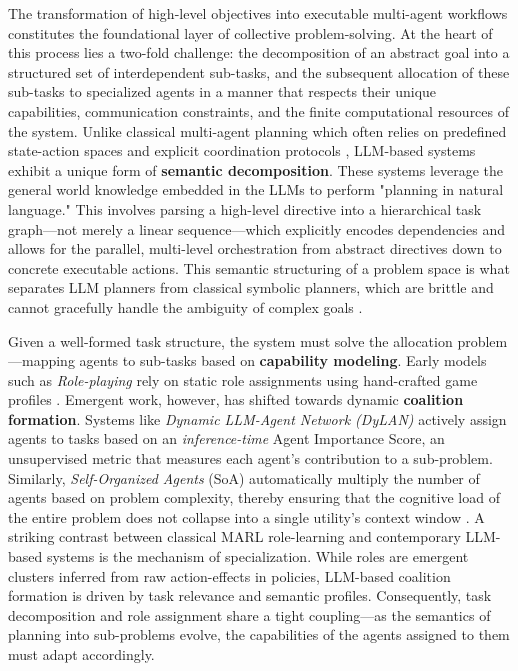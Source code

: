 \documentclass[11pt,a4paper]{article}
\begin{document}
The transformation of high-level objectives into executable multi-agent workflows constitutes the foundational layer of collective problem-solving. At the heart of this process lies a two-fold challenge: the decomposition of an abstract goal into a structured set of interdependent sub-tasks, and the subsequent allocation of these sub-tasks to specialized agents in a manner that respects their unique capabilities, communication constraints, and the finite computational resources of the system. Unlike classical multi-agent planning which often relies on predefined state-action spaces and explicit coordination protocols \cite{arxiv:1501.07423v1,arxiv:1803.05464v1}, LLM-based systems exhibit a unique form of \textbf{semantic decomposition}. These systems leverage the general world knowledge embedded in the LLMs to perform "planning in natural language." This involves parsing a high-level directive into a hierarchical task graph---not merely a linear sequence---which explicitly encodes dependencies and allows for the parallel, multi-level orchestration from abstract directives down to concrete executable actions. This semantic structuring of a problem space is what separates LLM planners from classical symbolic planners, which are brittle and cannot gracefully handle the ambiguity of complex goals \cite{arxiv:2402.05120v1,arxiv:2402.02716v1}.

Given a well-formed task structure, the system must solve the allocation problem---mapping agents to sub-tasks based on \textbf{capability modeling}. Early models such as \emph{Role-playing} rely on static role assignments using hand-crafted game profiles \cite{arxiv:2402.05120v1,arxiv:2308.03688v2}. Emergent work, however, has shifted towards dynamic \textbf{coalition formation}. Systems like \emph{Dynamic LLM-Agent Network (DyLAN)} actively assign agents to tasks based on an \emph{inference-time} Agent Importance Score, an unsupervised metric that measures each agent's contribution to a sub-problem. Similarly, \emph{Self-Organized Agents} (SoA) automatically multiply the number of agents based on problem complexity, thereby ensuring that the cognitive load of the entire problem does not collapse into a single utility's context window \cite{arxiv:2402.04578v3,arxiv:2402.01680v2}. A striking contrast between classical MARL role-learning \cite{arxiv:2003.08039v3,arxiv:2010.01523v1} and contemporary LLM-based systems is the mechanism of specialization. While roles are emergent clusters inferred from raw action-effects in policies, LLM-based coalition formation is driven by task relevance and semantic profiles. Consequently, task decomposition and role assignment share a tight coupling---as the semantics of planning into sub-problems evolve, the capabilities of the agents assigned to them must adapt accordingly.
\end{document}
